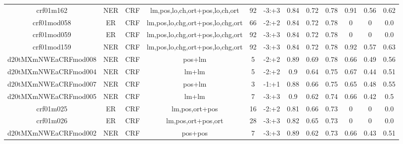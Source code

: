 \documentclass[a4paper]{article}
\begin{document}
\begin{landscape}
\begin{center}
\begin{tabular}{ |c|c|c|c|c|c|c|c|c|c|c|c|}
 
 	
 	\small{ crf01m162 } & NER & CRF & lm,pos,lo,ch,ort+pos,lo,ch,ort  &  92 &  -3:+3  &  0.84 & 0.72 & 0.78  &  0.91 & 0.56 & 0.62 \\
 	

 
 	
 	\small{ crf01mod058 } & ER & CRF & lm,pos,lo,chg,ort+pos,lo,chg,ort  &  66 &  -2:+2  &  0.84 & 0.72 & 0.78  &  0 & 0 & 0.0 \\
 	

 
 	
 	\small{ crf01mod059 } & ER & CRF & lm,pos,lo,chg,ort+pos,lo,chg,ort  &  92 &  -3:+3  &  0.84 & 0.72 & 0.78  &  0 & 0 & 0.0 \\
 	

 
 	
 	\small{ crf01mod159 } & NER & CRF & lm,pos,lo,chg,ort+pos,lo,chg,ort  &  92 &  -3:+3  &  0.84 & 0.72 & 0.78  &  0.92 & 0.57 & 0.63 \\
 	

 
 	
 	\small{ d20tMXmNWEaCRFmod008 } & NER & CRF & pos+lm  &  5 &  -2:+2  &  0.89 & 0.69 & 0.78  &  0.66 & 0.49 & 0.56 \\
 	

 
 	
 	\small{ d20tMXmNWEaCRFmod004 } & NER & CRF & lm+lm  &  5 &  -2:+2  &  0.9 & 0.64 & 0.75  &  0.67 & 0.44 & 0.51 \\
 	

 
 	
 	\small{ d20tMXmNWEaCRFmod007 } & NER & CRF & pos+lm  &  3 &  -1:+1  &  0.88 & 0.66 & 0.75  &  0.65 & 0.48 & 0.55 \\
 	

 
 	
 	\small{ d20tMXmNWEaCRFmod005 } & NER & CRF & lm+lm  &  7 &  -3:+3  &  0.9 & 0.62 & 0.74  &  0.66 & 0.42 & 0.5 \\
 	

 
 	
 	\small{ crf01m025 } & ER & CRF & lm,pos,ort+pos  &  16 &  -2:+2  &  0.81 & 0.66 & 0.73  &  0 & 0 & 0.0 \\
 	

 
 	
 	\small{ crf01m026 } & ER & CRF & lm,pos,ort+pos,ort  &  28 &  -3:+3  &  0.82 & 0.65 & 0.73  &  0 & 0 & 0.0 \\
 	

 
 	
 	\small{ d20tMXmNWEaCRFmod002 } & NER & CRF & pos+pos  &  7 &  -3:+3  &  0.89 & 0.62 & 0.73  &  0.66 & 0.43 & 0.51 \\
 	


\end{tabular}
\end{center}
\end{landscape}
\end{document}
